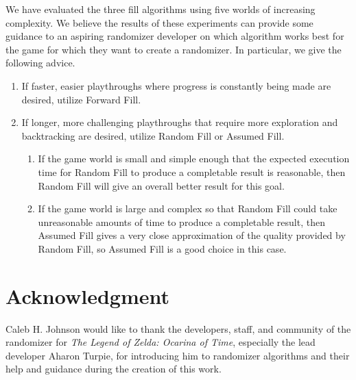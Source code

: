 \documentclass{ieeeaccess}
\begin{document}
We have evaluated the three fill algorithms using five worlds of increasing complexity. We
believe the results of these experiments can provide some guidance to an aspiring randomizer
developer on which algorithm works best for the game for which they want to create a
randomizer. In particular, we give the following advice.
\begin{enumerate}
    \item If faster, easier playthroughs where progress is constantly being made are desired,
    utilize Forward Fill.
    \item If longer, more challenging playthroughs that require more exploration and
    backtracking are desired, utilize Random Fill or Assumed Fill.
    \begin{enumerate}
        \item If the game world is small and simple enough that the expected execution time for
        Random Fill to produce a completable result is reasonable, then Random Fill will give
        an overall better result for this goal.
        \item If the game world is large and complex so that Random Fill could take
        unreasonable amounts of time to produce a completable result, then Assumed Fill gives a
        very close approximation of the quality provided by Random Fill, so Assumed Fill is a
        good choice in this case.
    \end{enumerate}
\end{enumerate}

\section*{Acknowledgment}

Caleb H. Johnson would like to thank the developers, staff, and community of the randomizer for 
\textit{The Legend of Zelda: Ocarina of Time}, especially the lead developer Aharon Turpie, for
introducing him to randomizer algorithms and their help and guidance during the creation of this work.
\end{document}
